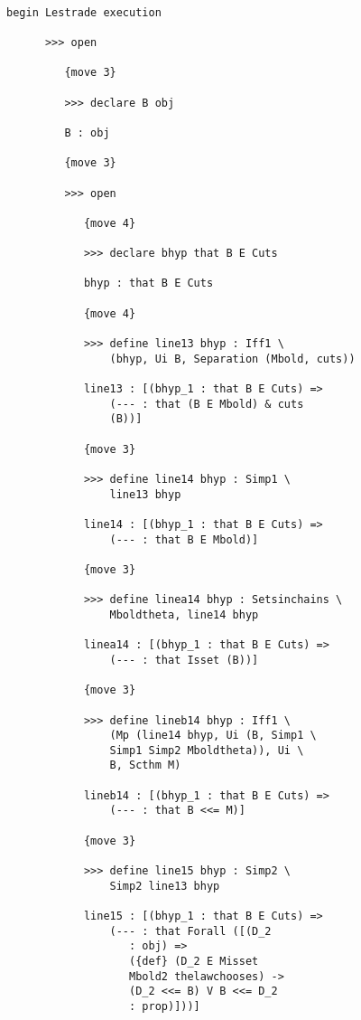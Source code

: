 \documentclass[12pt]{article}
\begin{document}
\begin{verbatim}

begin Lestrade execution

      >>> open

         {move 3}

         >>> declare B obj

         B : obj

         {move 3}

         >>> open

            {move 4}

            >>> declare bhyp that B E Cuts

            bhyp : that B E Cuts

            {move 4}

            >>> define line13 bhyp : Iff1 \
                (bhyp, Ui B, Separation (Mbold, cuts))

            line13 : [(bhyp_1 : that B E Cuts) => 
                (--- : that (B E Mbold) & cuts 
                (B))]

            {move 3}

            >>> define line14 bhyp : Simp1 \
                line13 bhyp

            line14 : [(bhyp_1 : that B E Cuts) => 
                (--- : that B E Mbold)]

            {move 3}

            >>> define linea14 bhyp : Setsinchains \
                Mboldtheta, line14 bhyp

            linea14 : [(bhyp_1 : that B E Cuts) => 
                (--- : that Isset (B))]

            {move 3}

            >>> define lineb14 bhyp : Iff1 \
                (Mp (line14 bhyp, Ui (B, Simp1 \
                Simp1 Simp2 Mboldtheta)), Ui \
                B, Scthm M)

            lineb14 : [(bhyp_1 : that B E Cuts) => 
                (--- : that B <<= M)]

            {move 3}

            >>> define line15 bhyp : Simp2 \
                Simp2 line13 bhyp

            line15 : [(bhyp_1 : that B E Cuts) => 
                (--- : that Forall ([(D_2 
                   : obj) => 
                   ({def} (D_2 E Misset 
                   Mbold2 thelawchooses) -> 
                   (D_2 <<= B) V B <<= D_2 
                   : prop)]))]


\end{verbatim}
\end{document}
